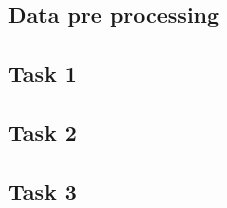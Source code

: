 \documentclass[titlepage]{article}
\begin{document}
	\subsection{Data pre processing}
	
	\subsection{Task 1}
	
	\subsection{Task 2}
	
	\subsection{Task 3}
	
\end{document}
